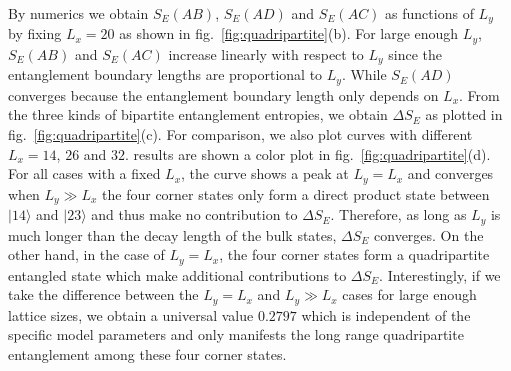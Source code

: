 \documentclass[doublecol]{epl2} %
\begin{document}
By numerics we obtain $S_E(AB)$, $S_E(AD)$ and $S_E(AC)$ as functions of $L_y$ by fixing $L_x=20$ as shown in fig.~\ref{fig:quadripartite}(b). For large enough $L_y$, $S_E(AB)$ and $S_E(AC)$ increase linearly with respect to $L_y$ since the entanglement boundary lengths are proportional to $L_y$. While $S_E(AD)$ converges because the entanglement boundary length only depends on $L_x$. From the three kinds of bipartite entanglement entropies, we obtain $\Delta S_E$ as plotted in fig.~\ref{fig:quadripartite}(c). For comparison, we also plot curves with different $L_x=14$, $26$ and $32$.  results are shown  a color plot in fig.~\ref{fig:quadripartite}(d). For all cases with a fixed $L_x$, the curve shows a peak at $L_y=L_x$ and converges when $L_y\gg L_x$  the four corner states only form a direct product state between $|14\rangle$ and $|23\rangle$ and thus make no contribution to $\Delta S_E$. 
Therefore, as long as $L_y$ is much longer than the decay length of the bulk states, $\Delta S_E$ converges. On the other hand, in the case of $L_y=L_x$, the four corner states form a quadripartite entangled state which make additional contributions to $\Delta S_E$. Interestingly, if we take the difference between the $L_y=L_x$ and $L_y\gg L_x$ cases for large enough lattice sizes, we obtain a universal value $0.2797$ which is independent of the specific model parameters and only manifests the long range quadripartite entanglement among these four corner states. 
\end{document}
